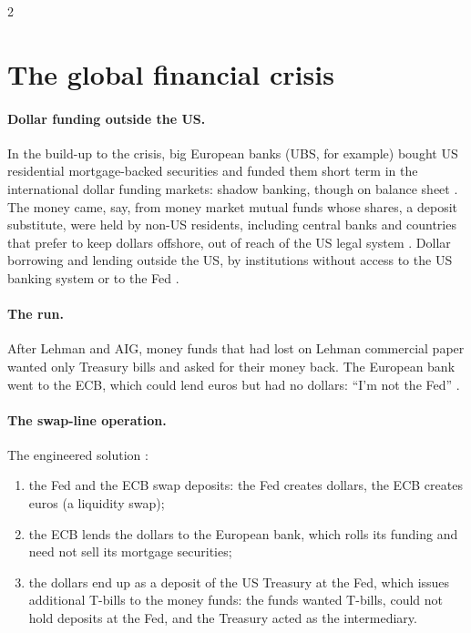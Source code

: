 \begin{paracol}{2}
\section{The global financial crisis}\label{sec:intl-gfc}

\paragraph{Dollar funding outside the US.} In the build-up to the crisis, big European banks (UBS, for example) bought US residential mortgage-backed securities and
funded them short term in the international dollar funding markets: shadow banking, though on balance sheet .
The money came, say, from money market mutual funds whose shares, a deposit substitute, were held by non-US residents, including central banks and countries that
prefer to keep dollars offshore, out of reach of the US legal system . Dollar borrowing and lending outside
the US, by institutions without access to the US banking system or to the Fed .

\paragraph{The run.} After Lehman and AIG, money funds that had lost on Lehman commercial paper wanted only Treasury bills and asked for their money back. The
European bank went to the ECB, which could lend euros but had no dollars: ``I'm not the Fed'' .

\paragraph{The swap-line operation.} The engineered solution :
\begin{enumerate}
  \item the Fed and the ECB swap deposits: the Fed creates dollars, the ECB creates euros (a liquidity swap);
  \item the ECB lends the dollars to the European bank, which rolls its funding and need not sell its mortgage securities;
  \item the dollars end up as a deposit of the US Treasury at the Fed, which issues additional T-bills to the money funds: the funds wanted T-bills, could not
        hold deposits at the Fed, and the Treasury acted as the intermediary.
\end{enumerate}


\end{paracol}
